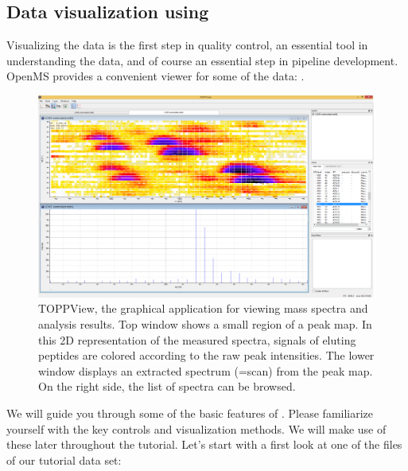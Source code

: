 

\subsection{Data visualization using }
\label{Data_Visualization}

Visualizing the data is the first step in quality control, an essential tool in understanding the data, and of course an essential step in pipeline development.
OpenMS provides a convenient viewer for some of the data: .

\begin{figure}
\includegraphics[width=\textwidth]{graphics/introduction/TOPPView.png}
\caption{TOPPView, the graphical application for viewing mass spectra and analysis results. Top window shows a small region of a peak map. In this 2D representation of the measured spectra, signals of eluting peptides are colored according to the raw peak intensities. The lower window displays an extracted spectrum (=scan) from the peak map. On the right side, the list of spectra can be browsed.}
\label{fig:toppview}
\end{figure}

We will guide you through some of the basic features of . Please familiarize yourself with the key controls and visualization methods.
We will make use of these later throughout the tutorial. Let's start with a first look at one of the files of our tutorial data set:


